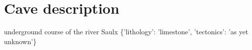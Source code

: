 \documentclass{article}%
\begin{document}
%
\normalsize%
\pagestyle{firstpage}%
\section{Cave description}%
\label{sec:Cavedescription}%
underground course of the river Saulx%
\{'lithology': 'limestone', 'tectonics': 'as yet unknown'\}

%
\end{document}

